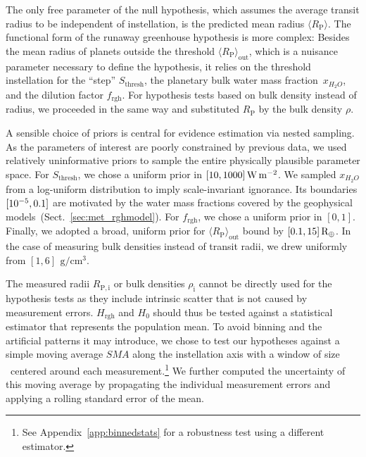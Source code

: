 \documentclass[twocolumn,twocolappendix,linenumbers]{aastex631}
\begin{document}
The only free parameter of the null hypothesis, which assumes the average transit radius to be independent of instellation, is the predicted mean radius $\langle R_\mathrm{P}\rangle $.
The functional form of the runaway greenhouse hypothesis is more complex: Besides the mean radius of planets outside the threshold $\langle R_\mathrm{P}\rangle_\mathrm{out}$, which is a nuisance parameter necessary to define the hypothesis, it relies on the threshold instellation for the ``step'' $S_\mathrm{thresh}$, the planetary bulk water mass fraction~$x_{H_2O}$, and the dilution factor $f_\mathrm{rgh}$.
For hypothesis tests based on bulk density instead of radius, we proceeded in the same way and substituted $R_\mathrm{P}$ by the bulk density $\rho$.

A sensible choice of priors is central for evidence estimation via nested sampling.
As the parameters of interest are poorly constrained by previous data, we used relatively uninformative priors to sample the entire physically plausible parameter space.
For $S_\mathrm{thresh}$, we chose a uniform prior in $[10,1000]\, \SI{}{\watt\per\meter\squared}$.
We sampled $x_{H_2O}$ from a log-uniform distribution to imply scale-invariant ignorance.
Its boundaries $[10^{-5}, 0.1]$ are motivated by the water mass fractions covered by the geophysical models~(Sect.~\ref{sec:met_rghmodel}).
For $f_\mathrm{rgh}$, we chose a uniform prior in $[0, 1]$.
Finally, we adopted a broad, uniform prior for $\langle R_\mathrm{P}\rangle_\mathrm{out}$ bound by $[0.1, 15] \, \mathrm{R_\oplus}$.
In the case of measuring bulk densities instead of transit radii, we drew uniformly from $[1, 6] \, \SI{}{\gram\per\centi\meter\cubed}$.

The measured radii $R_\mathrm{P, i}$ or bulk densities $\rho_\mathrm{i}$ cannot be directly used for the hypothesis tests as they include intrinsic scatter that is not caused by measurement errors.
$H_{\mathrm{rgh}}$ and $H_0$ should thus be tested against a statistical estimator that represents the population mean.
To avoid binning and the artificial patterns it may introduce, we chose to test our hypotheses against a simple moving average $SMA$ along the instellation axis with a window of size \windowsize\ centered around each measurement.\footnote{See Appendix~\ref{app:binnedstats} for a robustness test using a different estimator.}
We further computed the uncertainty of this moving average by propagating the individual measurement errors and applying a rolling standard error of the mean. %
\end{document}
